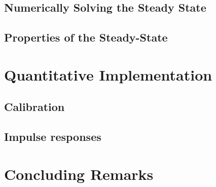 \documentclass[a4paper,12pt]{article} %
\numberwithin{equation}{section} %
\numberwithin{figure}{section}
\numberwithin{table}{section}
\begin{document}
\subsection{Numerically Solving the Steady State}
\label{sec:solution-num}


\subsection{Properties of the Steady-State}
\label{sec:solution-properties}

\section{Quantitative Implementation}
\label{sec:quant}


\subsection{Calibration}
\label{sec:quant-cal} 



\subsection{Impulse responses}
\label{sec:quant-IRF}



\section{Concluding Remarks}
\label{sec:conclusion}


\newpage
\thispagestyle{plain}
\printbibliography[heading=bibintoc] %
\end{document}
